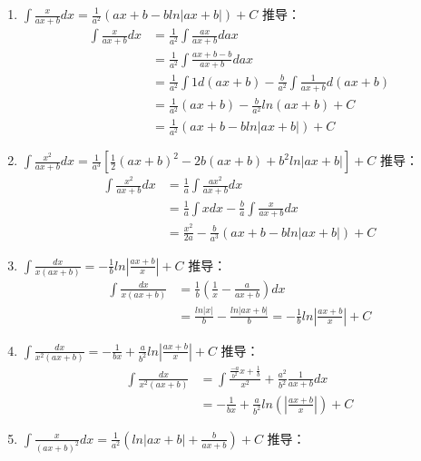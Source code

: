 \begin{enumerate}
			\item $\int\frac{x}{ax+b}dx = \frac{1}{a^2}(ax+b-bln|ax+b|)+C$
			推导：
			\begin{align}
				\label{eq:adv3}
				\int\frac{x}{ax+b}dx &= \frac{1}{a^2}\int\frac{ax}{ax+b}dax\\
				&=\frac{1}{a^2}\int\frac{ax+b-b}{ax+b}dax\\ 
				&=\frac{1}{a^2}\int1d(ax+b)-\frac{b}{a^2}\int\frac{1}{ax+b}d(ax+b)\\
				&=\frac{1}{a^2}(ax+b)-\frac{b}{a^2}ln(ax+b)+C\\
				&=\frac{1}{a^2}(ax+b-bln|ax+b|)+C
			\end{align}
		\item $\int\frac{x^2}{ax+b}dx=\frac{1}{a^3}\left[\frac{1}{2}(ax+b)^2-2b(ax+b)+b^2ln|ax+b|\right]+C$
		推导：
		\begin{equation}
			\label{eq:adv4}
			\begin{split}
				\int\frac{x^2}{ax+b}dx&=\frac{1}{a}\int\frac{ax^2}{ax+b}dx\\ 
				&= \frac{1}{a}\int xdx-\frac{b}{a}\int \frac{x}{ax+b}dx\\ 
				&= \frac{x^2}{2a}-\frac{b}{a^3}(ax+b-bln|ax+b|)+C
			\end{split}
		\end{equation}
		\item $\int\frac{dx}{x(ax+b)}=-\frac{1}{b}ln|\frac{ax+b}{x}|+C$
		推导：
		\begin{equation}
			\label{eq:adv5}
			\begin{split}
				\int\frac{dx}{x(ax+b)}&=\frac{1}{b}(\frac{1}{x}-\frac{a}{ax+b})dx\\ 
				&=\frac{ln|x|}{b}-\frac{ln|ax+b|}{b}=-\frac{1}{b}ln|\frac{ax+b}{x}|+C
			\end{split}
		\end{equation}
		\item $\int\frac{dx}{x^2(ax+b)}=-\frac{1}{bx}+\frac{a}{b^2}ln{|\frac{ax+b}{x}|}+C$
		推导：
		\begin{equation}
			\begin{split}
				\int\frac{dx}{x^2(ax+b)} &= \int \frac{\frac{-a}{b^2}x+\frac{1}{b}}{x^2}+\frac{a^2}{b^2}\frac{1}{ax+b}dx\\ 
				&=-\frac{1}{bx}+\frac{a}{b^2}ln(|\frac{ax+b}{x}|)+C
			\end{split}
		\end{equation}
		\item $\int\frac{x}{(ax+b)^2}dx=\frac{1}{a^2}(ln|ax+b|+\frac{b}{ax+b})+C$
		推导：
		\begin{equation}

\end{equation}
\end{enumerate}
